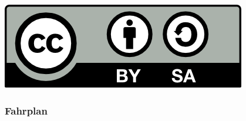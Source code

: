 \documentclass{beamer}
\title{\dctitle}
\author{\dcauthorsshort}
\date{\dcdate}
\institute{basierend auf ,,Cryptoparty an der LMU`` von Michael Weiner}
\begin{document}
\begin{frame}[plain]
    \titlepage

\vfill
\begin{flushright}
\href{https://creativecommons.org/licenses/by-sa/4.0/}{\includegraphics[height=3ex]{images/by-sa}}
\end{flushright}
\end{frame}

\begin{frame}
\frametitle{Fahrplan}
\tableofcontents[hidesubsections]
\end{frame}


\end{document}
